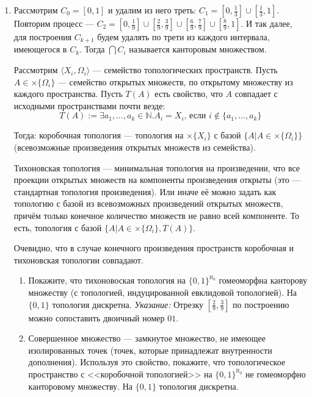 \documentclass[10pt,a4paper,oneside]{article}
\begin{document}
\begin{enumerate}
\item Рассмотрим $C_0 = [0,1]$ и удалим из него треть: $C_1 = [0,\frac{1}{3}] \cup [\frac{1}{3},1]$.
Повторим процесс --- $C_2 = [0,\frac{1}{9}] \cup [\frac{2}{9},\frac{3}{9}] \cup [\frac{6}{9},\frac{7}{9}] \cup [\frac{8}{9},1]$.
И так далее, для построения $C_{k+1}$ будем удалять по трети из каждого интервала, имеющегося в $C_k$.
Тогда $\bigcap C_i$ называется канторовым множеством.

Рассмотрим $\langle X_i, \Omega_i \rangle$ --- семейство топологических пространств.
Пусть $A \in \times \{\Omega_i\}$ --- семейство открытых множеств, по открытому множеству из каждого пространства.
Пусть $T(A)$ есть свойство, что $A$ совпадает с исходными пространствами почти везде: 
$$T(A) := \exists a_1,\dots,a_k \in \mathbb{N}.A_i = X_i\text{, если }i \notin \{a_1,\dots,a_k\}$$

Тогда: коробочная топология --- топология на $\times\{X_i\}$ с базой $\{ A | A \in \times \{\Omega_i\}\} $ (всевозможные произведения 
открытых множеств из семейства).

Тихоновская топология --- минимальная топология на произведении, что все проекции открытых множеств на компоненты произведения открыты
(это --- стандартная топология произведения).
Или иначе её можно задать как топологию с базой из всевозможных произведений открытых множеств,
причём только конечное количество множеств не равно всей компоненте.
То есть, топология с базой $\{A | A \in \times\{\Omega_i\}, T(A)\}$.

Очевидно, что в случае конечного произведения пространств коробочная и тихоновская топологии совпадают.

\begin{enumerate}
\item Покажите, что тихоновоская топология на $\{0,1\}^{\aleph_0}$ гомеоморфна канторову множеству (с топологией, индуцированной
евклидовой топологией). На $\{0,1\}$ топология дискретна. \emph{Указание:} Отрезку $[\frac{2}{9},\frac{3}{9}]$ по построению можно 
сопоставить двоичный номер $01$.

\item Совершенное множество --- замкнутое множество, не имеющее изолированных точек (точек, которые принадлежат внутренности дополнения).
Используя это свойство, покажите, что топологическое пространство с <<коробочной топологией>> на $\{0,1\}^{\aleph_0}$ не гомеоморфно канторовому множеству.
На $\{0,1\}$ топология дискретна.

\end{enumerate}

\end{enumerate}
\end{document}
